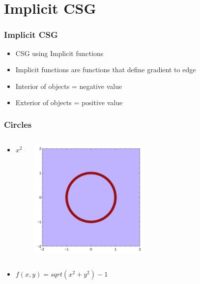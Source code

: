 \documentclass{beamer}
\begin{document}
\section{Implicit CSG}
\begin{frame}[fragile]
\frametitle{Implicit CSG}
\begin{itemize}
\item CSG using Implicit functions
\item Implicit functions are functions that define gradient to edge
\item Interior of objects = negative value
\item Exterior of objects = positive value
\end{itemize}
\end{frame}

\begin{frame}
\frametitle{Circles}
\begin{columns}
  \begin{column}{0.5\textwidth}
    \begin{itemize}
    \item $x^2+y^2=r^2$
    \end{itemize}
  \end{column}
  \begin{column}{0.5\textwidth}
    \includegraphics[width=0.5\textwidth, right]{normal_circle.jpg}
  \end{column}
\end{columns}
\begin{columns}
  \begin{column}{0.5\textwidth}
    \begin{itemize}
    \item $f(x,y)=sqrt(x^2+y^2)-1$
    \end{itemize}
  \end{column}
  \begin{column}{0.5\textwidth}

\end{column}
\end{columns}
\end{frame}
\end{document}
